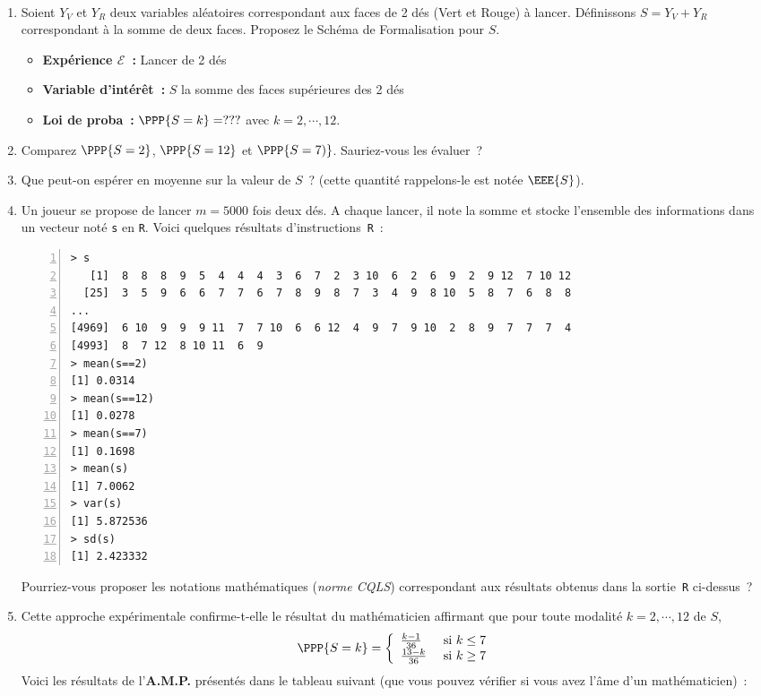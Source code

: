 \documentclass[10pt]{report}
\begin{document}
\begin{exercice}\label{ex:sommeDes} ${ }$\label{ex:sommeDes}


\begin{enumerate}
\item Soient $Y_V$ et $Y_R$ deux variables aléatoires correspondant aux faces de 2 dés (Vert et Rouge) à lancer. Définissons $S=Y_V+Y_R$ correspondant à la somme de deux faces.
Proposez le Schéma de Formalisation pour $S$. \\
\begin{Correction}
\begin{itemize}
\item \textbf{Expérience $\mathcal{E}$~:} Lancer de 2 dés
\item \textbf{Variable d'intérêt~:} $S$ la somme des faces supérieures des 2 dés
\item \textbf{Loi de proba~:} $\PPP{S=k}=???$ avec $k=2,\cdots,12$.
\end{itemize}
\end{Correction}

\item Comparez $\PPP{S=2}$, $\PPP{S=12}$ et $\PPP{S=7)}$. Sauriez-vous les évaluer~?

\item Que peut-on espérer en moyenne sur la valeur de $S$~? (cette quantité rappelons-le est notée $\EEE{S}$).


\item Un joueur se propose de lancer $m=5000$ fois deux dés. A chaque lancer, il note la somme et stocke l'ensemble des informations dans un vecteur noté \texttt{s} en \texttt{R}. Voici quelques résultats d'instructions~\texttt{R}~:
\begin{Verbatim}[frame=leftline,fontfamily=tt,fontshape=n,numbers=left]
> s
   [1]  8  8  8  9  5  4  4  4  3  6  7  2  3 10  6  2  6  9  2  9 12  7 10 12
  [25]  3  5  9  6  6  7  7  6  7  8  9  8  7  3  4  9  8 10  5  8  7  6  8  8
...
[4969]  6 10  9  9  9 11  7  7 10  6  6 12  4  9  7  9 10  2  8  9  7  7  7  4
[4993]  8  7 12  8 10 11  6  9
> mean(s==2)
[1] 0.0314
> mean(s==12)
[1] 0.0278
> mean(s==7)
[1] 0.1698
> mean(s)
[1] 7.0062
> var(s)
[1] 5.872536
> sd(s)
[1] 2.423332
\end{Verbatim}

\noindent Pourriez-vous proposer les notations mathématiques (\textit{norme CQLS}) correspondant aux résultats obtenus dans la sortie~\texttt{R} ci-dessus~?

\item Cette approche expérimentale confirme-t-elle le résultat du mathématicien affirmant que pour toute modalité $k=2,\cdots,12$ de $S$,
$$
\PPP{S=k} = \left\{ \begin{array}{ll}
\frac{k-1}{36} & \mbox{ si } k\leq 7 \\
\frac{13-k}{36} & \mbox{ si } k \geq 7
\end{array} \right.
$$
Voici les résultats de l'\textbf{A.M.P.} présentés dans le tableau suivant (que vous pouvez vérifier si vous avez l'âme d'un mathématicien)~:


\end{enumerate}
\end{exercice}
\end{document}
